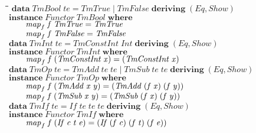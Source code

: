 \documentclass[10pt]{article}
\newlength{\lwidth}\setlength{\lwidth}{4.5cm}
\newlength{\cwidth}\setlength{\cwidth}{8mm} %
\newcommand{\Conid}[1]{\mathit{#1}}
\newcommand{\Varid}[1]{\mathit{#1}}
\begin{document}
\begin{tabbing}
\qquad\=\hspace{\lwidth}\=\hspace{\cwidth}\=\+\kill
${\mathbf{data}\;\Conid{TmBool}\;\Varid{te}\mathrel{=}\Conid{TmTrue}\mid \Conid{TmFalse}\;\mathbf{deriving}\;(\Conid{Eq},\Conid{Show})}$\\
${}$\\
${\mathbf{instance}\;\Conid{Functor}\;\Conid{TmBool}\;\mathbf{where}}$\\
${\hskip2.00em\relax\Varid{map}_{f}\;\Varid{f}\;\Conid{TmTrue}\mathrel{=}\Conid{TmTrue}}$\\
${\hskip2.00em\relax\Varid{map}_{f}\;\Varid{f}\;\Conid{TmFalse}\mathrel{=}\Conid{TmFalse}}$\\
${}$\\
${\mathbf{data}\;\Conid{TmInt}\;\Varid{te}\mathrel{=}\Conid{TmConstInt}\;\Conid{Int}\;\mathbf{deriving}\;(\Conid{Eq},\Conid{Show})}$\\
${}$\\
${\mathbf{instance}\;\Conid{Functor}\;\Conid{TmInt}\;\mathbf{where}}$\\
${\hskip2.00em\relax\Varid{map}_{f}\;\Varid{f}\;(\Conid{TmConstInt}\;\Varid{x})\mathrel{=}(\Conid{TmConstInt}\;\Varid{x})}$\\
${}$\\
${\mathbf{data}\;\Conid{TmOp}\;\Varid{te}\mathrel{=}\Conid{TmAdd}\;\Varid{te}\;\Varid{te}\mid \Conid{TmSub}\;\Varid{te}\;\Varid{te}\;\mathbf{deriving}\;(\Conid{Eq},\Conid{Show})}$\\
${}$\\
${\mathbf{instance}\;\Conid{Functor}\;\Conid{TmOp}\;\mathbf{where}}$\\
${\hskip2.00em\relax\Varid{map}_{f}\;\Varid{f}\;(\Conid{TmAdd}\;\Varid{x}\;\Varid{y})\mathrel{=}(\Conid{TmAdd}\;(\Varid{f}\;\Varid{x})\;(\Varid{f}\;\Varid{y}))}$\\
${\hskip2.00em\relax\Varid{map}_{f}\;\Varid{f}\;(\Conid{TmSub}\;\Varid{x}\;\Varid{y})\mathrel{=}(\Conid{TmSub}\;(\Varid{f}\;\Varid{x})\;(\Varid{f}\;\Varid{y}))}$\\
${}$\\
${\mathbf{data}\;\Conid{TmIf}\;\Varid{te}\mathrel{=}\Conid{If}\;\Varid{te}\;\Varid{te}\;\Varid{te}\;\mathbf{deriving}\;(\Conid{Eq},\Conid{Show})}$\\
${}$\\
${\mathbf{instance}\;\Conid{Functor}\;\Conid{TmIf}\;\mathbf{where}}$\\
${\hskip2.00em\relax\Varid{map}_{f}\;\Varid{f}\;(\Conid{If}\;\Varid{c}\;\Varid{t}\;\Varid{e})\mathrel{=}(\Conid{If}\;(\Varid{f}\;\Varid{c})\;(\Varid{f}\;\Varid{t})\;(\Varid{f}\;\Varid{e}))}$\\

\end{tabbing}
\end{document}
